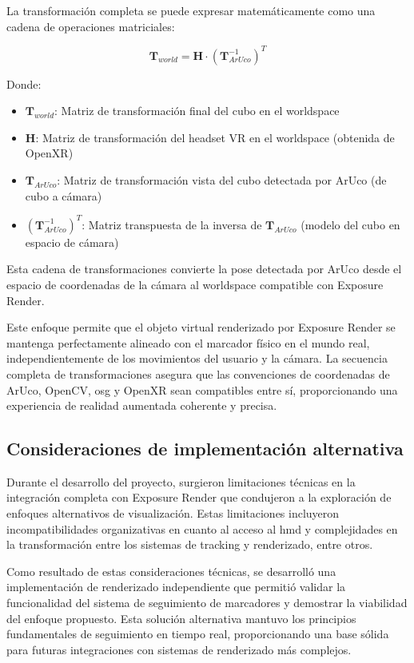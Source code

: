 La transformación completa se puede expresar matemáticamente como una cadena de operaciones matriciales:

$$\mathbf{T}_{world} = \mathbf{H} \cdot (\mathbf{T}_{ArUco}^{-1})^T$$

Donde:
\begin{itemize}
    \item $\mathbf{T}_{world}$: Matriz de transformación final del cubo en el \gls{worldspace}
    \item $\mathbf{H}$: Matriz de transformación del headset VR en el \gls{worldspace} (obtenida de OpenXR)
    \item $\mathbf{T}_{ArUco}$: Matriz de transformación vista del cubo detectada por ArUco (de cubo a cámara)
    \item $(\mathbf{T}_{ArUco}^{-1})^T$: Matriz transpuesta de la inversa de $\mathbf{T}_{ArUco}$ (modelo del cubo en espacio de cámara)
\end{itemize}

Esta cadena de transformaciones convierte la pose detectada por ArUco desde el espacio de coordenadas de la cámara al \gls{worldspace} compatible con Exposure Render.

Este enfoque permite que el objeto virtual renderizado por Exposure Render se mantenga perfectamente alineado con el marcador físico en el mundo real, independientemente de los movimientos del usuario y la cámara. La secuencia completa de transformaciones asegura que las convenciones de coordenadas de ArUco, OpenCV, \acrshort{osg} y OpenXR sean compatibles entre sí, proporcionando una experiencia de realidad aumentada coherente y precisa.

\subsection{Consideraciones de implementación alternativa}

Durante el desarrollo del proyecto, surgieron limitaciones técnicas en la integración completa con Exposure Render que condujeron a la exploración de enfoques alternativos de visualización. Estas limitaciones incluyeron incompatibilidades organizativas en cuanto al acceso al \acrshort{hmd} y complejidades en la transformación entre los sistemas de \gls{tracking} y renderizado, entre otros.

Como resultado de estas consideraciones técnicas, se desarrolló una implementación de renderizado independiente que permitió validar la funcionalidad del sistema de seguimiento de marcadores y demostrar la viabilidad del enfoque propuesto. Esta solución alternativa mantuvo los principios fundamentales de seguimiento en tiempo real, proporcionando una base sólida para futuras integraciones con sistemas de renderizado más complejos.


